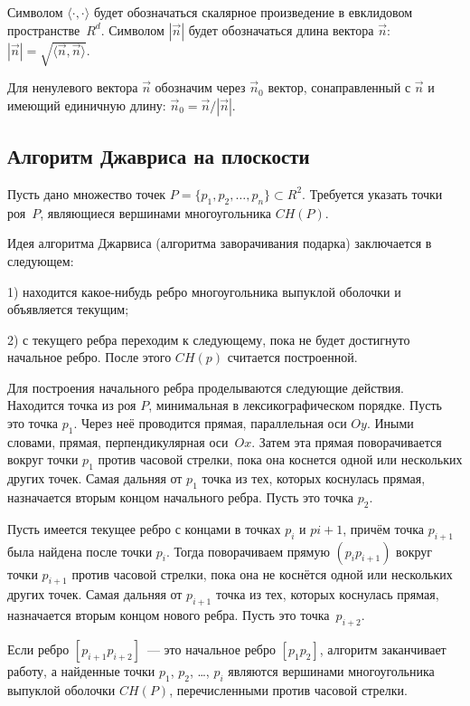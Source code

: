 \documentclass[14pt]{extarticle}
\begin{document}
Символом $\langle \cdot, \cdot \rangle$ будет обозначаться скалярное произведение в евклидовом пространстве~$R^d$. Символом $|\vec n|$ будет обозначаться длина вектора $\vec n$: $|\vec n| = \sqrt{\langle \vec n, \vec n\rangle}$.

Для ненулевого вектора $\vec n$ обозначим через $\vec n_0$ вектор, сонаправленный с $\vec n$ и имеющий единичную длину: $\vec n_0 = \vec n / |\vec n|$.


\subsection{Алгоритм Джавриса на плоскости}
\label{sec:ch2}

Пусть дано множество точек $P = \{p_1, p_2, \ldots, p_n\} \subset R^2$. Требуется указать точки роя~$P$, являющиеся вершинами многоугольника $CH(P)$.

Идея алгоритма Джарвиса (алгоритма заворачивания подарка) заключается в следующем:

1) находится какое-нибудь ребро многоугольника выпуклой оболочки и объявляется текущим;

2) с текущего ребра переходим к следующему, пока не будет достигнуто начальное ребро. После этого $CH(p)$ считается построенной.

\medskip

Для построения начального ребра проделываются следующие действия. Находится точка из роя $P$, минимальная в лексикографическом порядке. Пусть это точка $p_1$. Через неё проводится прямая, параллельная оси $Oy$. Иными словами, прямая, перпендикулярная оси~$Ox$. Затем эта прямая поворачивается вокруг точки $p_1$ против часовой стрелки, пока она коснется одной или нескольких других точек. Самая дальняя от $p_1$ точка из тех, которых коснулась прямая, назначается вторым концом начального ребра. Пусть это точка $p_2$.

\medskip

Пусть имеется текущее ребро с концами в точках $p_i$ и $p{i+1}$, причём точка $p_{i+1}$ была найдена после точки $p_i$. Тогда поворачиваем прямую $(p_ip_{i+1})$ вокруг точки $p_{i+1}$ против часовой стрелки, пока она не коснётся одной или нескольких других точек. Самая дальняя от $p_{i+1}$ точка из тех, которых коснулась прямая, назначается вторым концом нового ребра. Пусть это точка~$p_{i+2}$.

Если ребро $[p_{i+1}p_{i+2}]$~--- это начальное ребро $[p_1p_2]$, алгоритм заканчивает работу, а найденные точки $p_1$, $p_2$, \ldots, $p_i$ являются вершинами многоугольника выпуклой оболочки $CH(P)$, перечисленными против часовой стрелки.
\end{document}

